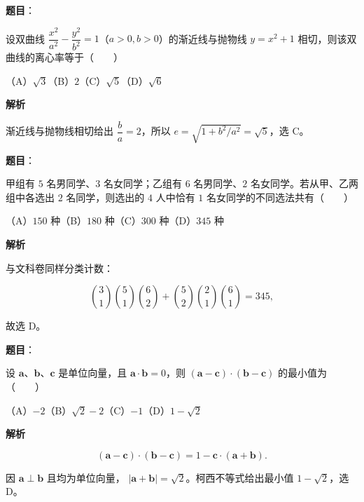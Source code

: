 \begin{answer}

\textbf{题目}：

设双曲线 $\dfrac{x^2}{a^2}-\dfrac{y^2}{b^2}=1$（$a>0,b>0$）的渐近线与抛物线 $y=x^2+1$ 相切，则该双曲线的离心率等于\mbox{（　　）}

（A）$\sqrt3$\quad（B）$2$\quad（C）$\sqrt5$\quad（D）$\sqrt6$

\textbf{解析}

渐近线与抛物线相切给出 $\dfrac ba=2$，所以
$e=\sqrt{1+b^2/a^2}=\sqrt5$，选 C。


\end{answer}
\begin{answer}

\textbf{题目}：

甲组有 $5$ 名男同学、$3$ 名女同学；乙组有 $6$ 名男同学、$2$ 名女同学。若从甲、乙两组中各选出 $2$ 名同学，则选出的 $4$ 人中恰有 $1$ 名女同学的不同选法共有\mbox{（　　）}

（A）$150$ 种\quad（B）$180$ 种\quad（C）$300$ 种\quad（D）$345$ 种

\textbf{解析}

与文科卷同样分类计数：

\nopagebreak[4]
\[
\binom31\binom51\binom62+\binom52\binom21\binom61
=345,
\]

故选 D。


\end{answer}
\begin{answer}

\textbf{题目}：

设 $\boldsymbol a\text{、}\boldsymbol b\text{、}\boldsymbol c$ 是单位向量，且 $\boldsymbol a\cdot\boldsymbol b=0$，则 $(\boldsymbol a-\boldsymbol c)\cdot(\boldsymbol b-\boldsymbol c)$ 的最小值为\mbox{（　　）}

（A）$-2$\quad（B）$\sqrt2-2$\quad（C）$-1$\quad（D）$1-\sqrt2$

\textbf{解析}

\nopagebreak[4]
\[
(\boldsymbol a-\boldsymbol c)\cdot(\boldsymbol b-\boldsymbol c)
=1-\boldsymbol c\cdot(\boldsymbol a+\boldsymbol b).
\]

因 $\boldsymbol a\perp\boldsymbol b$ 且均为单位向量，
$|\boldsymbol a+\boldsymbol b|=\sqrt2$。柯西不等式给出最小值
$1-\sqrt2$，选 D。


\end{answer}
